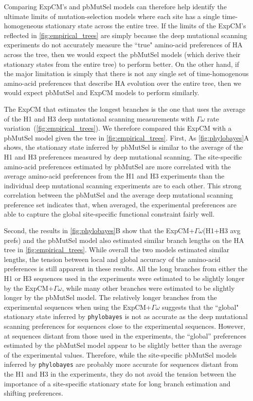 \documentclass[11pt]{article}
\begin{document}
Comparing ExpCM's and pbMutSel models can therefore help identify the ultimate limits of mutation-selection models where each site has a single time-homogeneous stationary state across the entire tree. 
If the limits of the ExpCM's reflected in \ref{fig:empirical_trees} are simply because the deep mutational scanning experiments do not accurately measure the ``true" amino-acid preferences of HA across the tree, then we would expect the pbMutSel models (which derive their stationary states from the entire tree) to perform better.
On the other hand, if the major limitation is simply that there is not any single set of time-homogenous amino-acid preferences that describe HA evolution over the entire tree, then we would expect pbMutSel and ExpCM models to perform similarly.

The ExpCM that estimates the longest branches is the one that uses the average of the H1 and H3 deep mutational scanning measurements with $\Gamma\omega$ rate variation~(\ref{fig:empirical_trees}).  
We therefore compared this ExpCM with a pbMutSel model given the tree in \ref{fig:empirical_trees}. 
First, As \ref{fig:phylobayes}A shows, the stationary state inferred by pbMutSel is similar to the average of the H1 and H3 preferences measured by deep mutational scanning. 
The site-specific amino-acid preferences estimated by pbMutSel are more correlated with the average amino-acid preferences from the H1 and H3 experiments than the individual deep mutational scanning experiments are to each other. 
This strong correlation between the pbMutSel and the average deep mutational scanning preference set indicates that, when averaged, the experimental preferences are able to capture the global site-specific functional constraint fairly well. 

Second, the results in \ref{fig:phylobayes}B show that the ExpCM+$\Gamma\omega$(H1+H3 avg prefs) and the pbMutSel model also estimated similar branch lengths on the HA tree in \ref{fig:empirical_trees}. 
While overall the two models estimated similar lengths, the tension between local and global accuracy of the amino-acid preferences is still apparent in these results. 
All the long branches from either the H1 or H3 sequences used in the experiments were estimated to be slightly longer by the ExpCM+$\Gamma\omega$, while many other branches were estimated to be slightly longer by the pbMutSel model. 
The relatively longer branches from the experimental sequences when using the ExpCM+$\Gamma\omega$ suggests that the ``global" stationary state inferred by \texttt{phylobayes} is not as accurate as the deep mutational scanning preferences for sequences close to the experimental sequences. 
However, at sequences distant from those used in the experiments, the ``global'' preferences estimated by the pbMutSel model appear to be slightly better than the average of the experimental values.
Therefore, while the site-specific pbMutSel models inferred by \texttt{phylobayes} are probably more accurate for sequences distant from the H1 and H3 in the experiments, they do not avoid the tension between the importance of a site-specific stationary state for long branch estimation and shifting preferences. 
\end{document}
